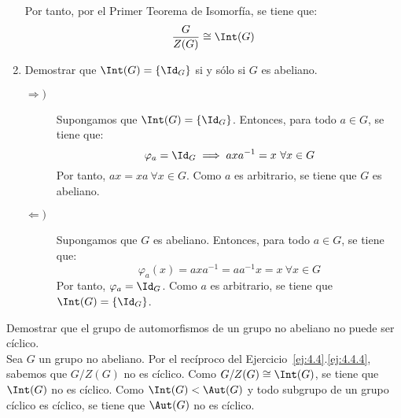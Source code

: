 \begin{ejercicio}
\begin{enumerate}
        Por tanto, por el Primer Teorema de Isomorfía, se tiene que:
        \begin{equation*}
            \dfrac{G}{Z(G)}\cong \Int(G)
        \end{equation*}
        \item Demostrar que $\Int(G)=\{\Id_G\}$ si y sólo si $G$ es abeliano.
        \begin{description}
            \item[$\Longrightarrow)$] Supongamos que $\Int(G)=\{\Id_G\}$. Entonces, para todo $a\in G$, se tiene que:
            \begin{equation*}
                \varphi_a = \Id_G \implies axa^{-1} = x\ \forall x\in G
            \end{equation*}
            Por tanto, $ax=xa\ \forall x\in G$. Como $a$ es arbitrario, se tiene que $G$ es abeliano.
            \item[$\Longleftarrow)$] Supongamos que $G$ es abeliano. Entonces, para todo $a\in G$, se tiene que:
            \begin{equation*}
                \varphi_a(x) = axa^{-1} = aa^{-1}x = x\ \forall x\in G
            \end{equation*}
            Por tanto, $\varphi_a = \Id_G$. Como $a$ es arbitrario, se tiene que $\Int(G)=\{\Id_G\}$.
        \end{description}
    \end{enumerate}
\end{ejercicio}

\begin{ejercicio}
    Demostrar que el grupo de automorfismos de un grupo no abeliano no puede ser cíclico.\\

    Sea $G$ un grupo no abeliano. Por el recíproco del Ejercicio~\ref{ej:4.4}.\ref{ej:4.4.4}, sabemos que $G/Z(G)$ no es cíclico. Como $G/Z(G)\cong \Int(G)$, se tiene que $\Int(G)$ no es cíclico. Como $\Int(G)< \Aut(G)$ y todo subgrupo de un grupo cíclico es cíclico, se tiene que $\Aut(G)$ no es cíclico.
\end{ejercicio}

